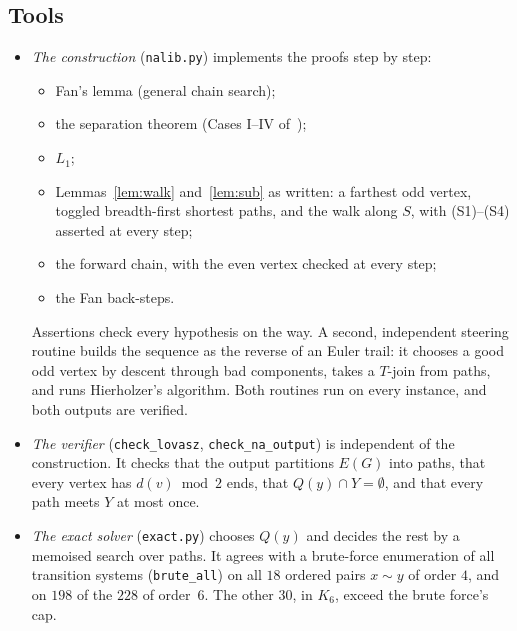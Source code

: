 \documentclass[11pt]{amsart}
\theoremstyle{definition}
\begin{document}
\subsection*{Tools}
\begin{itemize}
\item \emph{The construction} (\texttt{nalib.py}) implements the proofs step by step:
  \begin{itemize}
  \item Fan's lemma (general chain search);
  \item the separation theorem (Cases I--IV of~\cite{RD});
  \item $L_1$;
  \item Lemmas~\ref{lem:walk} and~\ref{lem:sub} as written: a farthest odd vertex, toggled
  breadth-first shortest paths, and the walk along $S$, with (S1)--(S4) asserted at every step;
  \item the forward chain, with the even vertex checked at every step;
  \item the Fan back-steps.
  \end{itemize}
  Assertions check every hypothesis on the way. A second, independent steering routine builds the
  sequence as the reverse of an Euler trail: it chooses a good odd vertex by descent through bad
  components, takes a $T$-join from paths, and runs Hierholzer's algorithm. Both routines run on
  every instance, and both outputs are verified.
\item \emph{The verifier} (\texttt{check\_lovasz}, \texttt{check\_na\_output}) is independent of the
construction. It checks that the output partitions $E(G)$ into paths, that every vertex has
$d(v)\bmod2$ ends, that $Q(y)\cap Y=\emptyset$, and that every path meets $Y$ at most once.
\item \emph{The exact solver} (\texttt{exact.py}) chooses $Q(y)$ and decides the rest by a memoised
search over paths. It agrees with a brute-force enumeration of all transition systems
(\texttt{brute\_all}) on all $18$ ordered pairs $x\sim y$ of order $4$, and on $198$ of the $228$
of order~$6$. The other $30$, in $K_6$, exceed the brute force's cap.
\end{itemize}
\end{document}
